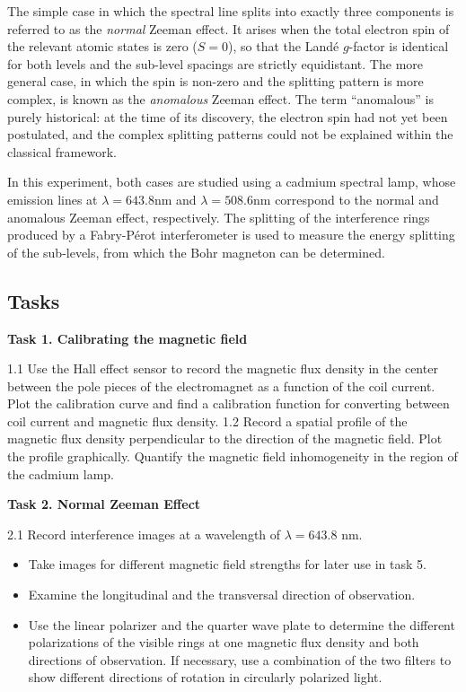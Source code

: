 \documentclass{article}
\begin{document}
The simple case in which the spectral line splits into exactly three components is referred to as the \textit{normal} Zeeman effect. It arises when the total electron spin of the relevant atomic states is zero ($S=0$), so that the Landé $g$-factor is identical for both levels and the sub-level spacings are strictly equidistant. The more general case, in which the spin is non-zero and the splitting pattern is more complex, is known as the \textit{anomalous} Zeeman effect. The term ``anomalous'' is purely historical: at the time of its discovery, the electron spin had not yet been postulated, and the complex splitting patterns could not be explained within the classical framework.

In this experiment, both cases are studied using a cadmium spectral lamp, whose emission lines at $\lambda = 643.8$nm and $\lambda = 508.6$nm correspond to the normal and anomalous Zeeman effect, respectively. The splitting of the interference rings produced by a Fabry-Pérot interferometer is used to measure the energy splitting of the sub-levels, from which the Bohr magneton can be determined.

\subsection{Tasks}
\textbf{Task 1. Calibrating the magnetic field}

1.1 Use the Hall effect sensor to record the magnetic flux density in the center between the
pole pieces of the electromagnet as a function of the coil current. Plot the calibration
curve and find a calibration function for converting between coil current and magnetic
flux density.
1.2 Record a spatial profile of the magnetic flux density perpendicular to the direction of the
magnetic field. Plot the profile graphically. Quantify the magnetic field inhomogeneity
in the region of the cadmium lamp.

\textbf{Task 2. Normal Zeeman Effect}

2.1 Record interference images at a wavelength of $\lambda = 643.8$ nm.
\begin{itemize}
    \item Take images for different magnetic field strengths for later use in task 5.
    \item Examine the longitudinal and the transversal direction of observation.
    \item Use the linear polarizer and the quarter wave plate to determine the different polarizations of the visible rings at one magnetic flux density and both directions of observation. If necessary, use a combination of the two filters to show different directions of rotation in circularly polarized light.
\end{itemize}
\end{document}

